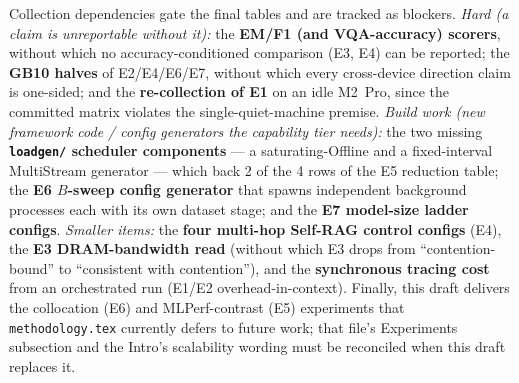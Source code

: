 Collection dependencies gate the final tables and are tracked as blockers.
\emph{Hard (a claim is unreportable without it):} the \textbf{EM/F1 (and
VQA-accuracy) scorers}, without which no accuracy-conditioned comparison
(E3, E4) can be reported; the \textbf{GB10 halves} of E2/E4/E6/E7, without
which every cross-device direction claim is one-sided; and the
\textbf{re-collection of E1} on an idle M2~Pro, since the committed matrix
violates the single-quiet-machine premise. \emph{Build work (new framework
code / config generators the capability tier needs):} the two missing
\textbf{\texttt{loadgen/} scheduler components} --- a saturating-Offline and
a fixed-interval MultiStream generator --- which back 2 of the 4 rows of the
E5 reduction table; the \textbf{E6 $B$-sweep config generator} that spawns
independent background processes each with its own dataset stage; and the
\textbf{E7 model-size ladder configs}. \emph{Smaller items:} the
\textbf{four multi-hop Self-RAG control configs} (E4), the
\textbf{E3 DRAM-bandwidth read} (without which E3 drops from
``contention-bound'' to ``consistent with contention''), and the
\textbf{synchronous tracing cost} from an orchestrated run
(E1/E2 overhead-in-context). Finally, this draft delivers
the collocation (E6) and MLPerf-contrast (E5) experiments that
\texttt{methodology.tex} currently defers to future work; that file's
Experiments subsection and the Intro's scalability wording must be
reconciled when this draft replaces it.
